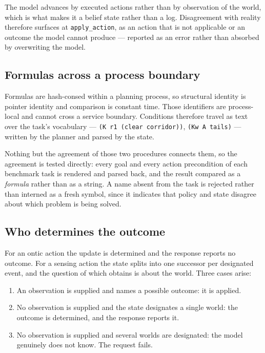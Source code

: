 \documentclass[11pt,a4paper]{article}
\theoremstyle{definition}
\newcommand{\code}[1]{\texttt{\small #1}}
\begin{document}
The model advances by executed actions rather than by observation of the world,
which is what makes it a belief state rather than a log. Disagreement with
reality therefore surfaces at \code{apply\_action}, as an action that is not
applicable or an outcome the model cannot produce --- reported as an error rather
than absorbed by overwriting the model.

\subsection{Formulas across a process boundary}

Formulas are hash-consed within a planning process, so structural identity is
pointer identity and comparison is constant time. Those identifiers are
process-local and cannot cross a service boundary. Conditions therefore travel as
text over the task's vocabulary --- \code{(K r1 (clear corridor))},
\code{(Kw A tails)} --- written by the planner and parsed by the state.

Nothing but the agreement of those two procedures connects them, so the agreement
is tested directly: every goal and every action precondition of each benchmark
task is rendered and parsed back, and the result compared as a \emph{formula}
rather than as a string. A name absent from the task is rejected rather than
interned as a fresh symbol, since it indicates that policy and state disagree
about which problem is being solved.

\subsection{Who determines the outcome}

For an ontic action the update is determined and the response reports no outcome.
For a sensing action the state splits into one successor per designated event,
and the question of which obtains is about the world. Three cases arise:

\begin{enumerate}[leftmargin=*, itemsep=2pt]
  \item An observation is supplied and names a possible outcome: it is applied.
  \item No observation is supplied and the state designates a single world: the
        outcome is determined, and the response reports it.
  \item No observation is supplied and several worlds are designated: the model
        genuinely does not know. The request fails.
\end{enumerate}
\end{document}
